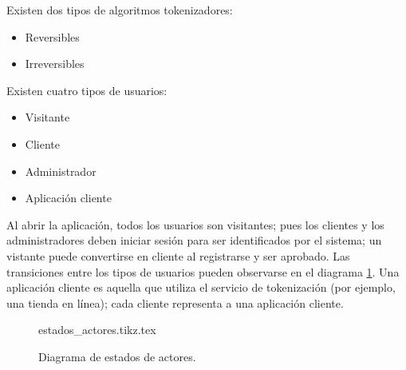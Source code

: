 {
  Existen dos tipos de algoritmos tokenizadores:
  \begin{itemize}
    \item Reversibles
    \item Irreversibles
  \end{itemize}
}

{
  Existen cuatro tipos de usuarios:
  \begin{itemize}
    \item Visitante
    \item Cliente
    \item Administrador
    \item Aplicación cliente
  \end{itemize}

  \begin{hangparas}{2em}{0}
    Al abrir la aplicación, todos los usuarios son visitantes; pues los clientes
    y los administradores deben iniciar sesión para ser identificados por el
    sistema; un vistante puede convertirse en cliente al registrarse y ser
    aprobado. Las transiciones entre los tipos de usuarios pueden observarse en
    el diagrama \ref{estados_actores}. Una aplicación cliente es aquella que
    utiliza el servicio de tokenización (por ejemplo, una tienda en línea); cada
    cliente representa a una aplicación cliente.
  \end{hangparas}
}

\begin{figure}
  \begin{center}
    {estados_actores.tikz.tex}
    \caption{Diagrama de estados de actores.}
    \label{estados_actores}
  \end{center}
\end{figure}

